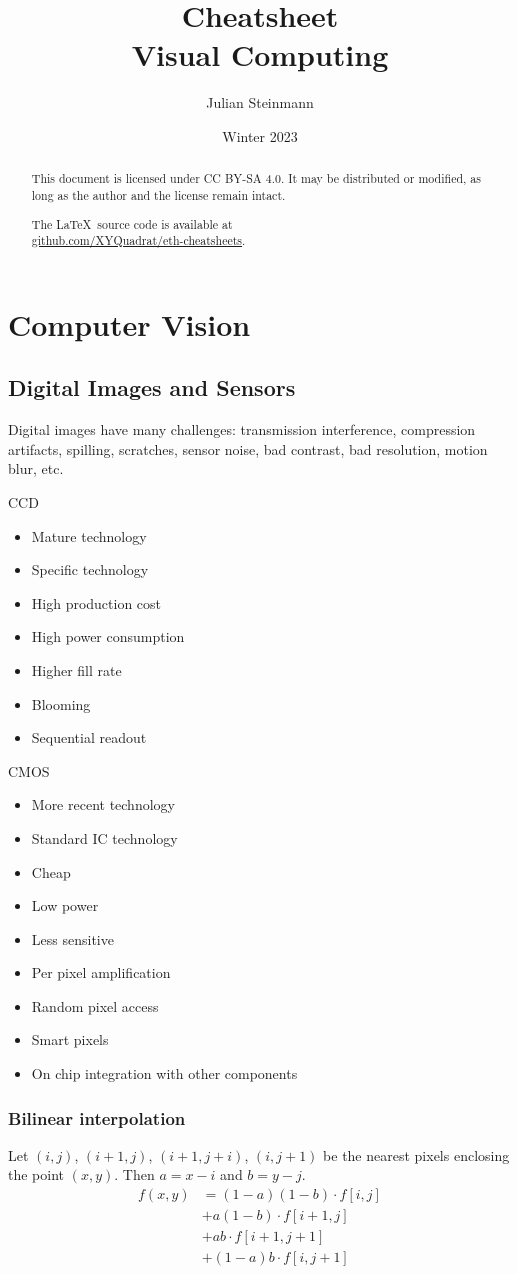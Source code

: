 \documentclass[a4paper,10pt]{article}
\title{Cheatsheet\\ Visual Computing}
\author{Julian Steinmann}
\date{\vspace{-10pt}Winter 2023}
\newcommand*\good{\item[\textcolor{goodgreen}{\(\bm{+}\)}]}
\newcommand*\bad{\item[\textcolor{badred}{\(\bm{-}\)}]}
\begin{document}
\maketitle

\renewcommand{\abstractname}{License}
\begin{abstract}
	This document is licensed under CC BY-SA 4.0. It may be distributed or modified, as long as the author and the license remain intact.

	\begin{center}
	    The \LaTeX\ source code is available at \\ \href{https://github.com/XYQuadrat/eth-cheatsheets}{\color{brandblue}github.com/XYQuadrat/eth-cheatsheets}.
	\end{center}
\end{abstract}

\section{Computer Vision}
\subsection{Digital Images and Sensors}
Digital images have many challenges: transmission interference, compression artifacts, spilling, scratches, sensor noise, bad contrast, bad resolution, motion blur, etc.
\begin{subbox}{CCD}
    \begin{itemize}
        \good Mature technology
        \bad Specific technology
        \bad High production cost
        \bad High power consumption
        \good Higher fill rate
        \bad Blooming
        \bad Sequential readout
    \end{itemize}
\end{subbox}{}
\begin{subbox}{CMOS}
    \begin{itemize}
        \item More recent technology
        \good Standard IC technology
        \good Cheap
        \good Low power
        \bad Less sensitive
        \good Per pixel amplification
        \good Random pixel access
        \good Smart pixels
        \good On chip integration with other components
    \end{itemize}
\end{subbox}

\subsubsection{Bilinear interpolation}
Let \((i, j)\), \((i + 1, j)\), \((i + 1, j + i)\), \((i, j + 1)\) be the nearest pixels enclosing the point \((x, y)\). Then \(a = x - i\) and \(b = y - j\).
\begin{align*}
    f(x, y) &= (1 - a)(1 - b) \cdot f[i, j]\\
    &+ a(1 - b) \cdot f[i + 1, j]\\
    &+ ab \cdot f[i + 1, j + 1]\\
    &+ (1 - a)b \cdot f[i, j + 1]
\end{align*}
\end{document}
